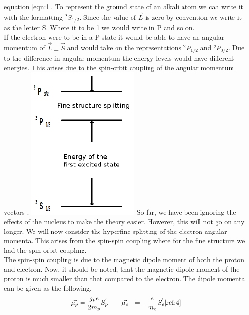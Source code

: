 \documentclass[twocolumn]{article}
\begin{document}
equation \ref{eqn:1}. To represent the ground state of an alkali atom we can 
write it with the formatting $^{2}S_{1/2}$. Since the value of $\vec{L}$ is 
zero by convention we write it as the letter S. Where it to be 1 we would write 
in P and so on.
\\
If the electron were to be in a P state it would be able to have an angular 
momentum of $\vec{L}\pm\vec{S}$ and would take on the representations 
$^{2}P_{1/2}$ and $^{2}P_{3/2}$. Due to the difference in angular momentum the 
energy levels would have different energies. This arises due to the spin-orbit 
coupling of the angular momentum vectors \cite{ref:4}.
\center
\includegraphics[width=0.5\linewidth]{pictures/energy-levels.png}
\label{fig:2}
\justify
So far, we have been ignoring the effects of the nucleus to make the theory 
easier. However, this will not go on any longer. We will now consider the 
hyperfine splitting of the electron angular momenta. This arises from the 
spin-spin coupling where for the fine structure we had the spin-orbit coupling. 
\\
The spin-spin coupling is due to the magnetic dipole moment of both the proton 
and electron. Now, it should be noted, that the magnetic dipole moment of the 
proton is much smaller than that compared to the electron. The dipole momenta 
can be given as the following.
\begin{equation}
\begin{aligned}
\vec{\mu_p} &= \frac{g_pe}{2m_p}\vec{S_p}
\qquad
\vec{\mu_e} &= -\frac{e}{m_e}\vec{S_e}
\label{eqn:2}
\cite{ref:4}
\end{aligned}
\end{equation}
\end{document}
